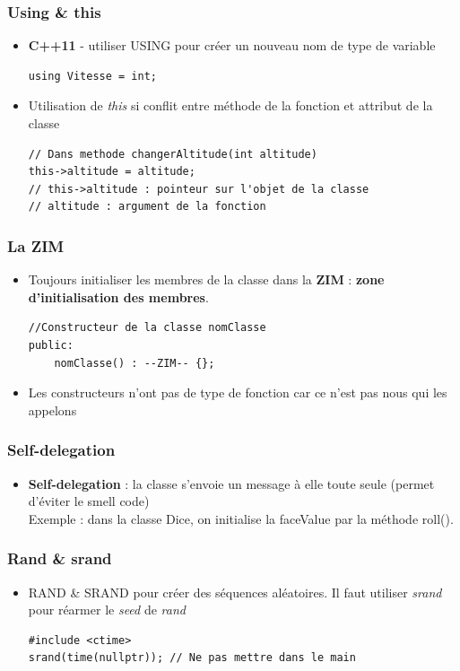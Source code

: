 \documentclass[12pt,a4paper]{article}
\begin{document}
\subsubsection{Using \& this}
\begin{itemize}
\item \textbf{C++11} - utiliser USING pour créer un nouveau nom de type de variable
\begin{lstlisting}
using Vitesse = int;
\end{lstlisting}
\item Utilisation de \textit{this} si conflit entre méthode de la fonction et attribut de la classe
\begin{lstlisting}
// Dans methode changerAltitude(int altitude)
this->altitude = altitude;
// this->altitude : pointeur sur l'objet de la classe
// altitude : argument de la fonction
\end{lstlisting}
\end{itemize}
\subsubsection{La ZIM}
\begin{itemize}
\item Toujours initialiser les membres de la classe dans la \textbf{ZIM} : \textbf{zone d'initialisation des membres}.
\begin{lstlisting}
//Constructeur de la classe nomClasse
public:
	nomClasse() : --ZIM-- {};
\end{lstlisting}
\item Les constructeurs n'ont pas de type de fonction car ce n'est pas nous qui les appelons
\end{itemize}
\subsubsection{Self-delegation}
\begin{itemize}
\item \textbf{Self-delegation} : la classe s'envoie un message à elle toute seule (permet d'éviter le smell code)\\
Exemple : dans la classe Dice, on initialise la faceValue par la méthode roll().
\end{itemize}
\subsubsection{Rand \& srand}
\begin{itemize}
\item RAND \& SRAND pour créer des séquences aléatoires. Il faut utiliser \textit{srand} pour réarmer le \textit{seed} de \textit{rand}
\begin{lstlisting}
#include <ctime>
srand(time(nullptr)); // Ne pas mettre dans le main
\end{lstlisting}
\end{itemize}
\end{document}
